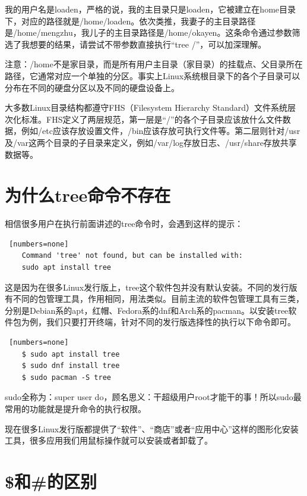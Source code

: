 \par 我的用户名是loaden，严格的说，我的主目录只是loaden，它被建立在home目录下，对应的路径就是/home/loaden。依次类推，我妻子的主目录路径是/home/mengzhu，我儿子的主目录路径是/home/okayen。这条命令通过参数筛选了我想要的结果，请尝试不带参数直接执行“tree /”，可以加深理解。
\par 注意：/home不是家目录，而是所有用户主目录（家目录）的挂载点、父目录所在路径，它通常对应一个单独的分区。事实上Linux系统根目录下的各个子目录可以分布在不同的硬盘分区以及不同的硬盘设备上。
\par 大多数Linux目录结构都遵守FHS（Filesystem Hierarchy Standard）文件系统层次化标准。FHS定义了两层规范，第一层是“/”的各个子目录应该放什么文件数据，例如/etc应该存放设置文件，/bin应该存放可执行文件等。第二层则针对/usr及/var这两个目录的子目录来定义，例如/var/log存放日志、/usr/share存放共享数据等。


\section{为什么tree命令不存在}

\par 相信很多用户在执行前面讲述的tree命令时，会遇到这样的提示：
\begin{lstlisting} [numbers=none]
    Command 'tree' not found, but can be installed with:
    sudo apt install tree
\end{lstlisting}

\par 这是因为在很多Linux发行版上，tree这个软件包并没有默认安装。不同的发行版有不同的包管理工具，作用相同，用法类似。目前主流的软件包管理工具有三类，分别是Debian系的apt，红帽、Fedora系的dnf和Arch系的pacman。以安装tree软件包为例，我们只要打开终端，针对不同的发行版选择性的执行以下命令即可。
\begin{lstlisting} [numbers=none]
    $ sudo apt install tree
    $ sudo dnf install tree
    $ sudo pacman -S tree
\end{lstlisting}

\par sudo全称为：super user do，顾名思义：干超级用户root才能干的事！所以sudo最常用的功能就是提升命令的执行权限。
\par 现在很多Linux发行版都提供了“软件”、“商店”或者“应用中心”这样的图形化安装工具，很多应用我们用鼠标操作就可以安装或者卸载了。

\section{\$和\#的区别}

